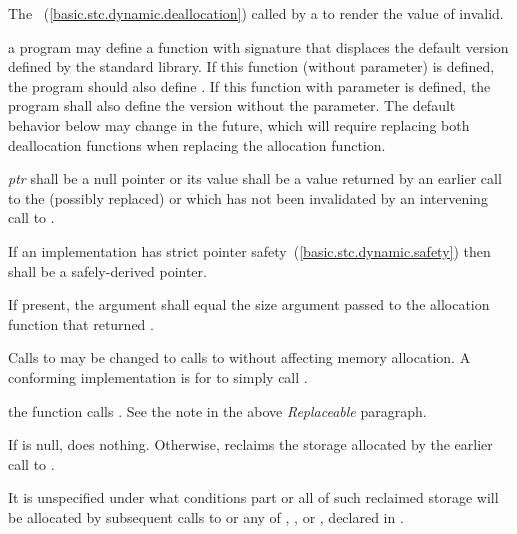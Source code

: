 \begin{itemdescr}
\pnum
\effects
The
~(\ref{basic.stc.dynamic.deallocation})
called by a
to render the value of  invalid.

\pnum
\replaceable
a \Cpp program may define a function with signature
that displaces the default version defined by the
\Cpp standard library. If this function (without  parameter) is defined,
the program should also define
.
If this function with  parameter is defined, the program shall also
define the version without the  parameter.
\enternote The default behavior below may change in the future, which will require
replacing both deallocation functions when replacing the allocation function.
\exitnote

\pnum
\requires
\textit{ptr} shall be a null pointer or
its value shall be a value returned by an
earlier call to the (possibly replaced)
or
which has not been invalidated by an intervening call to
.

\pnum
\requires
If an implementation has strict pointer safety~(\ref{basic.stc.dynamic.safety})
then  shall be a safely-derived pointer.

\pnum
\requires If present, the  argument shall equal the size
argument passed to the allocation function that returned .

\pnum
\required Calls to  may be changed
to calls to  without affecting memory allocation.
\enternote A conforming implementation is for
 to simply call
. \exitnote

\pnum
{} the function  calls
.
\enternote See the note in the above \textit{Replaceable} paragraph. \exitnote

\pnum
{}
If  is null, does nothing. Otherwise, reclaims the
storage allocated by the earlier call to .

\pnum
\notes
It is unspecified under what conditions part or all of such
%
reclaimed storage will be allocated by subsequent
calls to
or any of
,
,
or
,
declared in
.
\end{itemdescr}

